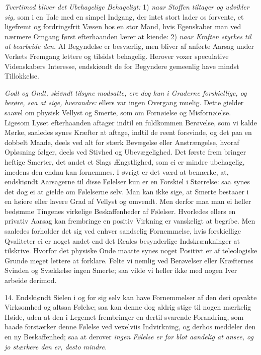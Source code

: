 \documentclass[12pt,a4paper]{article}
\newcommand{\opage}[1]{\marginnote{\footnotesize\textit{[#1]}}}
\begin{document}
\emph{Tvertimod bliver det Ubehagelige Behageligt:} 1) \emph{naar Stoffen tiltager og
udvikler sig,} som i en Tale med en simpel Indgang, der intet stort lader os forvente, et
ligefremt og fordringsfrit Væsen hos en stor Mand, hvis Egenskaber man ved nærmere Omgang
først efterhaanden lærer at kiende: 2) \emph{naar Kraften styrkes til at bearbeide den.} Al
Begyndelse er besværlig, men bliver af anførte Aarsag under Verkets Fremgang lettere og
tilsidst behagelig. Herover voxer speculative Videnskabers Interesse, endskiøndt de for
Begyndere gemeenlig have mindst Tillokkelse.

\emph{Godt og Ondt, skiøndt tilsyne modsatte, ere dog kun i Graderne forskiellige, og
berøre, saa at sige, hverandre:} ellers var ingen Overgang muelig. Dette gielder saavel om
physisk Vellyst og Smerte, som om Fornøielse og Misfornøielse. Ligesom Lyset efterhaanden
aftager indtil en fuldkommen Berøvelse, som vi kalde Mørke, saaledes synes Kræfter at
aftage, indtil de reent forsvinde, og det paa en dobbelt Maade, deels ved alt for stærk
Bevægelse eller Anstrængelse, hvoraf Opløsning følger, deels ved Stivhed og Ubevægelighed.
Det første frem%
\opage{215}bringer heftige Smerter, det andet et Slags Ængstlighed, som ei er mindre ubehagelig,
imedens den endnu kan fornemmes. I øvrigt er det værd at bemærke, at, endskiøndt Aarsagerne
til disse Følelser kun er en Forskiel i Størrelse: saa synes det dog ei at gielde om
Følelserne selv. Man kan ikke sige, at Smerte bestaaer i en høiere eller lavere Grad af
Vellyst og omvendt. Men derfor maa man ei heller bedømme Tingenes virkelige Beskaffenheder
af Følelser. Hvorledes ellers en privativ Aarsag kan frembringe en positiv Virkning er
vanskeligt at begribe. Men saaledes forholder det sig ved enhver sandselig Fornemmelse,
hvis forskiellige Qvaliteter ei er noget andet end det Reales besynderlige Indskrænkninger
at tilskrive. Hvorfor det physiske Onde maatte synes noget Positivt er af teleologiske
Grunde meget lettere at forklare. Følte vi nemlig ved Berøvelser eller Kræfternes Svinden
og Svækkelse ingen Smerte; saa vilde vi heller ikke med nogen Iver arbeide derimod.

14. Endskiøndt Sielen i og for sig selv kan have Fornemmelser af den deri opvakte
Virksomhed og altsaa Følelse; saa kan denne dog aldrig stige til nogen mærkelig Høide, uden
at den i Legemet frembringer en dertil svarende Forandring, som baade forstærker denne
Følelse ved vexelviis Indvirkning, og derhos meddeler den en ny Beskaffenhed; saa at
derover \emph{ingen Følelse er for
\opage{216} blot aandelig at ansee, og jo stærkere den er, desto mindre.}
\end{document}
